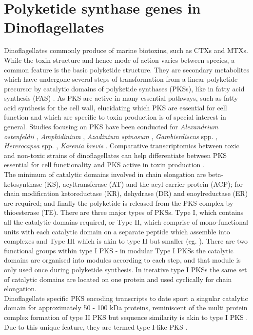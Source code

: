\documentclass[12pt]{article}
\begin{document}
\section{Polyketide synthase genes in Dinoflagellates}
Dinoflagellates commonly produce of marine biotoxins, such as CTXs and MTXs. While the toxin structure and hence mode of action varies between species, a common feature is the basic polyketide structure. They are secondary metabolites which have undergone several steps of transformation from a linear polyketide precursor by catalytic domains of polyketide synthases (PKSs), like in fatty acid synthesis (FAS) \cite{rein1999polyketides}. %
As PKS are active in many essential pathways, such as fatty acid synthesis for the cell wall, elucidating which PKS are essential for cell function and which are specific to toxin production is of special interest in general. Studies focusing on PKS have been conducted for \emph{Alexandrium ostenfeldii} \cite{eichholz2012putative}, \emph{Amphidinium} \cite{murray2012genetic}, \emph{Azadinium spinosum} \cite{meyer20152transcriptomic}, \emph{Gambierdiscus} spp. \cite{pawlowiez2014transcriptome,kohli2015polyketide}, \emph{Hererocapsa} spp. \cite{eichholz2012putative,salcedo2012dozens}, \emph{Karenia brevis} \cite{monroe2008toxic,ryan2014novo}. 
Comparative transcriptomics between toxic and non-toxic strains of dinoflagellates can help differentiate between PKS essential for cell functionality and PKS active in toxin production \cite{kohli2015polyketide}. \\
The minimum of catalytic domains involved in chain elongation are beta-ketosynthase (KS), acyltransferase (AT) and the acyl carrier protein (ACP); for chain modification ketoreductase (KR), dehydrase (DR) and enoylreductase (ER) are required; and finally the polyketide is released from the PKS complex by thioesterase (TE). There are three major types of PKSs. Type I, which contains all the catalytic domains required, or Type II, which comprise of mono-functional units with each catalytic domain on a separate peptide which assemble into complexes and Type III which is akin to type II but smaller (eg. \cite{eichholz2012putative}). There are two functional groups within type I PKS - in modular Type I PKSs the catalytic domains are organised into modules according to each step, and that module is only used once during polyketide synthesis. In iterative type I PKSs the same set of catalytic domains are located on  one protein and used cyclically for chain elongation.\\ 
Dinoflagellate specific PKS encoding transcripts to date sport a singular catalytic domain for approximately 50 - 100 kDa proteins, reminiscent of the multi protein complex formation of type II PKS but sequence similarity is akin to type I PKS \cite{monroe2008toxic,eichholz2012putative}. Due to this unique feature, they are termed type I-like PKS \cite{monroe2010characterization}.
\end{document}
